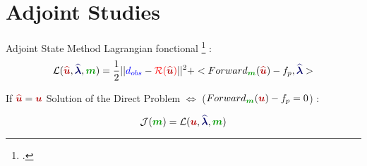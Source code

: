 \section{Adjoint Studies}
\renewcommand\tikzscale{1.3}



\begin{frame}{Adjoint State Method}
\scriptsize
Lagrangian fonctional \footcite{plessixReviewAdjointstateMethod2006} :
  \begin{equation}
    \Lag(\qcqU,\qcqLbd,\model) = \frac{1}{2}||\textcolor{blue}{d_{obs}}-\textcolor{red}{\mathcal{R}(\qcqU)}||^2 + <\DP(\qcqU)-f_p,\qcqLbd>
  \end{equation}

    If $\qcqU=\contU$ Solution of the Direct Problem $\Longleftrightarrow$ ($\DP(\contU)-f_p = 0$) :

  \begin{equation}
    \CF(\model) = \Lag(\contU,\qcqLbd,\model)
  \end{equation}



\end{frame}



















